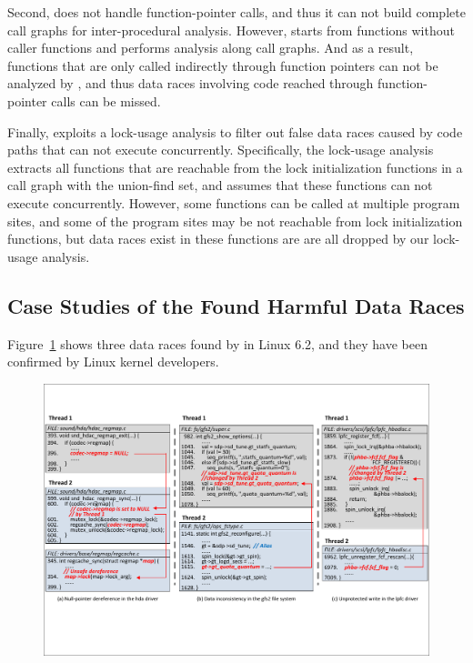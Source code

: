 Second, \sys does not handle function-pointer calls, and thus it can not build 
complete call graphs for inter-procedural analysis. However, \sys starts 
from functions without caller functions and performs analysis along call 
graphs. And as a result, functions that are only called indirectly through 
function pointers can not be analyzed by \sys, and thus data races involving 
code reached through function-pointer calls can be missed.

Finally, \sys exploits a lock-usage analysis to filter out false data races 
caused by code paths that can not execute concurrently. Specifically, the 
lock-usage analysis extracts all functions that are reachable from the lock 
initialization functions in a call graph with the union-find set, and assumes 
that these functions can not execute concurrently. However, some functions can 
be called at multiple program sites, and some of the program sites may be not 
reachable from lock initialization functions, but data races exist in these 
functions are are all dropped by our lock-usage analysis.

\subsection{Case Studies of the Found Harmful Data Races}
\label{subsec_case_study}

Figure~\ref{fig_case_bugs} shows three data races found by \sys in Linux 6.2,
and they have been confirmed by Linux kernel developers.

\begin{figure}[htbp]
	\centering
	\includegraphics[width=1\linewidth]{figures/fig_case_bugs.pdf}
	\label{fig_case_bugs}
\end{figure}

